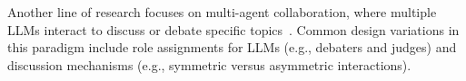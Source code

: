 Another line of research focuses on multi-agent collaboration, where multiple LLMs interact to discuss or debate specific topics~\cite{du2023improvingfactualityreasoninglanguage,liang-etal-2024-encouraging,chan2023chatevalbetterllmbasedevaluators,xu2023reasoninglargelanguagemodels,liu2024a,he-etal-2023-lego,chen-etal-2024-reconcile,zhang-etal-2024-exploring}. 
Common design variations in this paradigm include role assignments for LLMs (e.g., debaters and judges) and discussion mechanisms (e.g., symmetric versus asymmetric interactions).










